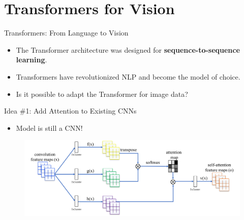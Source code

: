 \section{Transformers for Vision}

\begin{frame}{Transformers: From Language to Vision}
    \begin{itemize}
        \item The Transformer architecture was designed for \textbf{sequence-to-sequence learning}.
        \item Transformers have revolutionized NLP and become the model of choice.
	\item Is it possible to adapt the Transformer for image data?
    \end{itemize}
\end{frame}


\begin{frame}{Idea \#1: Add Attention to Existing CNNs}
    \begin{itemize}
        \item Model is still a CNN!
    \end{itemize}
    \begin{figure}
        \centering
        \includegraphics[width=\linewidth]{pic/framework}
        \label{fig:idea1}
    \end{figure}
\end{frame}

